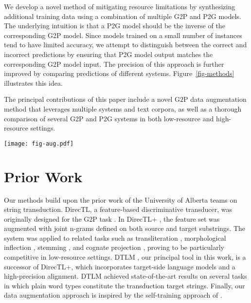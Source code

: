 \documentclass[11pt,a4paper]{article}
\begin{document}
We develop a novel method of mitigating resource limitations
by synthesizing additional training data
using a combination of multiple G2P and P2G models.
The underlying intuition is 
that a P2G model should be the inverse of the corresponding G2P model.
Since models trained on a small number of instances
tend to have limited accuracy,
we attempt to distinguish between the correct and incorrect predictions  
by ensuring that P2G model output matches the corresponding G2P model input.
The precision of this approach is further improved 
by comparing predictions of different systems.
Figure~\ref{fig-methods} illustrates this idea.



The principal contributions of this paper include
a novel G2P data augmentation method 
that leverages multiple systems and text corpora,
as well as 
a thorough comparison of several G2P and P2G systems 
in both low-resource and high-resource settings.

\begin{figure*}[t]
  \center
  \texttt{[image: fig-aug.pdf]}
   \caption{Our approach to synthesizing additional G2P training data.}
  \label{fig-methods}
\end{figure*}

\section{Prior Work}
\label{relwork}









Our methods build upon the prior work of the University of Alberta teams
on string transduction.
DirecTL,
a feature-based discriminative transducer,
was originally designed for the G2P task \cite{jiampojamarn2008joint}.
In DirecTL+ \cite{jiampojamarn-etal-2010-transliteration},
the feature set was augmented with joint n-grams
defined on both source and target substrings.
The system was applied to related tasks 
such as transliteration \cite{jiampojamarn-etal-2009-directl},
morphological inflection \cite{nicolai2015inflection},
stemming \cite{nicolai2016leveraging},
and cognate projection \cite{hauer-etal-2019-cognate},
proving to be particularly competitive in low-resource settings.
DTLM \cite{nicolai2018},
our principal tool in this work, 
is a successor of DirecTL+,
which incorporates target-side language models 
and a high-precision alignment.
DTLM achieved state-of-the-art results on several tasks
in which plain word types constitute the transduction target strings.
Finally, our data augmentation approach is inspired by 
the self-training approach of 
.
\end{document}
